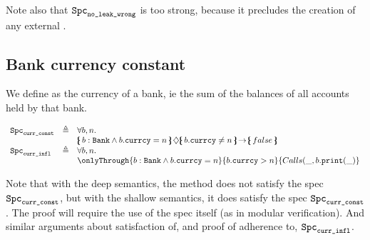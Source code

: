 \noindent
Note also that
 ${\texttt{Spc}}_{{\texttt{no\_leak\_wrong}}} $ is too strong, because it precludes the creation of any external  .
 
 \subsection{Bank currency constant}
 
 We define as  the currency of a bank, ie the sum of the balances of all accounts held by that bank.
 
 $\begin{array}{lll}
 \Spec{curr\_const} & \triangleq &  \forall b,n.\\
 & &   \onlyIf{b:\prg{Bank}\wedge b.\prg{currcy}=n}{b.\prg{currcy}\neq n} {false}\   
 \\
  \Spec{curr\_infl} & \triangleq &  \forall b,n.\\
 & &   \onlyThrough{b:\prg{Bank}\wedge b.\prg{currcy}=n}{b.\prg{currcy}> n} {\calls{\_}{b}{\prg{print}}{\_} }   
\end{array}
$
 
 Note that with the deep semantics, the method   does not satisfy the spec $ {\texttt{Spc}}_{{\texttt{curr\_const}}}$, but with the shallow semantics, it does satisfy the spec $ {\texttt{Spc}}_{{\texttt{curr\_const}}}$. The proof will require the use of the spec itself (as in modular verification). And similar arguments about satisfaction of,  and proof of  adherence to, ${\texttt{Spc}}_{{\texttt{curr\_infl}}}$.
 